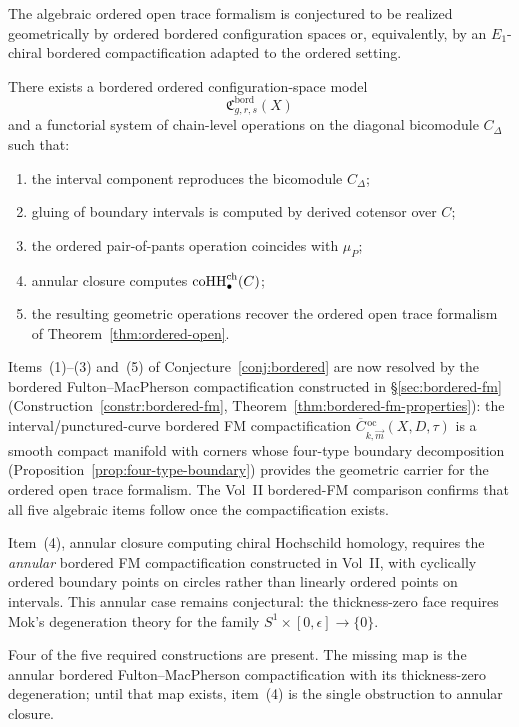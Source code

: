 The algebraic ordered open trace formalism is conjectured to be realized geometrically by ordered bordered
configuration spaces or, equivalently, by an $E_1$-chiral bordered compactification adapted to the
ordered setting.

\begin{conjecture}
\ClaimStatusConjectured
\label{conj:bordered}
There exists a bordered ordered configuration-space model
\[
\mathfrak C^{\mathrm{bord}}_{g,r,s}(X)
\]
and a functorial system of chain-level operations on the diagonal bicomodule $C_\Delta$ such that:
\begin{enumerate}[label=(\arabic*)]
\item the interval component reproduces the bicomodule $C_\Delta$;
\item gluing of boundary intervals is computed by derived cotensor over $C$;
\item the ordered pair-of-pants operation coincides with $\mu_P$;
\item annular closure computes $\operatorname{coHH}^{\mathrm{ch}}_\bullet(C)$;
\item the resulting geometric operations recover the ordered open trace formalism of
Theorem~\ref{thm:ordered-open}.
\end{enumerate}
\end{conjecture}

\begin{remark}
\label{rem:bordered-partial-resolution}
Items~(1)--(3) and~(5) of Conjecture~\ref{conj:bordered} are now resolved
by the bordered Fulton--MacPherson compactification constructed in
\S\ref{sec:bordered-fm} (Construction~\ref{constr:bordered-fm},
Theorem~\ref{thm:bordered-fm-properties}):
the interval/punctured-curve bordered FM compactification
$\overline{C}{}^{\,\mathrm{oc}}_{k,\vec{m}}(X, D, \tau)$ is a smooth
compact manifold with corners whose four-type boundary decomposition
(Proposition~\ref{prop:four-type-boundary}) provides the geometric
carrier for the ordered open trace formalism. The Vol~II bordered-FM
comparison confirms that all five algebraic items follow once the
compactification exists.

Item~(4), annular closure computing chiral Hochschild homology,
requires the \emph{annular} bordered FM compactification
constructed in Vol~II, with cyclically ordered boundary points on
circles rather than linearly ordered points on intervals. This annular
case remains conjectural: the thickness-zero face requires Mok's
degeneration theory for the family $S^1\times[0,\epsilon]\to\{0\}$.

Four of the five required constructions are present. The missing map is
the annular bordered Fulton--MacPherson compactification with its
thickness-zero degeneration; until that map exists, item~(4) is the
single obstruction to annular closure.
\end{remark}

